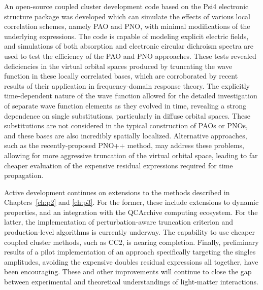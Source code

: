 An open-source coupled cluster development code based on the Psi4 electronic
structure package was developed which can simulate the effects of various
local correlation schemes, namely PAO and PNO, with minimal modifications of
the underlying expressions. The code is capable of modeling explicit electric
fields, and simulations of both absorption and electronic circular dichroism
spectra are used to test the efficiency of the PAO and PNO approaches. These
tests revealed deficiencies in the virtual orbital spaces produced by
truncating the wave function in these locally correlated bases, which are
corroborated by recent results of their application in frequency-domain
response theory. The explicitly time-dependent nature of the wave
function allowed for the detailed investigation of separate wave function
elements as they evolved in time, revealing a strong dependence on single
substitutions, particularly in diffuse orbital spaces. These substitutions
are not considered in the typical construction of PAOs or PNOs, and these
bases are also incredibly spatially localized. Alternative approaches,
such as the recently-proposed PNO++ method, may address these problems,
allowing for more aggressive truncation of the virtual orbital space,
leading to far cheaper evaluation of the expensive residual expressions
required for time propagation.

Active development continues on extensions to the methods described
in Chapters~\ref{ch:p2} and \ref{ch:p3}. For the former, these
include extensions to dynamic properties, and an integration with the
QCArchive computing ecosystem. For the latter, the implementation of
perturbation-aware truncation criterion and production-level algorithms is
currently underway. The capability to use cheaper coupled cluster methods,
such as CC2, is nearing completion. Finally, preliminary results of a pilot
implementation of an approach specifically targeting the singles amplitudes,
avoiding the expensive doubles residual expressions all together, have
been encouraging. These and other improvements will continue to close the
gap between experimental and theoretical understandings of light-matter
interactions.

